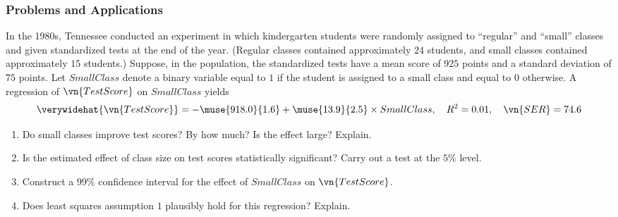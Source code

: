 

\begin{frame}
\frametitle{Problems and Applications}
In the 1980s, Tennessee conducted an experiment in which kindergarten students were randomly assigned to ``regular'' and ``small'' classes and given standardized tests at the end of the year. (Regular classes contained approximately $24$ students, and small classes contained approximately $15$ students.) Suppose, in the population, the standardized tests have a mean score of $925$ points and a standard deviation of $75$ points. Let $SmallClass$ denote a binary variable equal to $1$ if the student is assigned to a small class and equal to $0$ otherwise. A regression of $\vn{TestScore}$ on $SmallClass$ yields
\begin{align*}
\verywidehat{\vn{TestScore}} 
  = -\muse{918.0}{1.6} + \muse{13.9}{2.5} \times SmallClass,
  \quad R^2 = 0.01,
  \quad \vn{SER} = 74.6
\end{align*}
\vspace*{-2ex}
\begin{enumerate}
\item Do small classes improve test scores? By how much? Is the effect large? Explain.
\item Is the estimated effect of class size on test scores statistically significant? Carry out a test at the $5\%$ level.
\item Construct a $99\%$ confidence interval for the effect of $SmallClass$ on $\vn{TestScore}$.
\item Does least squares assumption $1$ plausibly hold for this regression? Explain.
\end{enumerate}
\end{frame}

